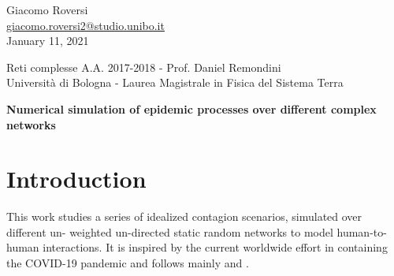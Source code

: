 \documentclass[DIV=12, BCOR=0pt]{scrartcl}  %
\begin{document}
%	
%



\begin{flushright}
	{\large Giacomo Roversi} \\ 
	{\small \href{mailto:giacomo.roversi2@studio.unibo.it}{giacomo.roversi2@studio.unibo.it} }\\
	\vskip0.15in
	{\large January 11, 2021}
\end{flushright}

\begin{flushleft}
	{\Large \color{gray}
		Reti complesse A.A. 2017-2018 - Prof. Daniel Remondini  \\
		Università di Bologna - Laurea Magistrale in Fisica del Sistema Terra}


	\vskip0.2in
	{\huge\textbf{Numerical simulation of epidemic processes over different complex networks}} 
	\vskip0.33in
	
\end{flushleft}
	
	\section*{Introduction}
	\label{sec:intro}
	This work studies a series of idealized contagion scenarios, simulated over different un- weighted un-directed static random networks to model human-to-human interactions. It is inspired by the current worldwide effort in containing the COVID-19 pandemic and follows mainly \citet{PastorSatorras} and \citet{Firth2020}.
	
\end{document}
